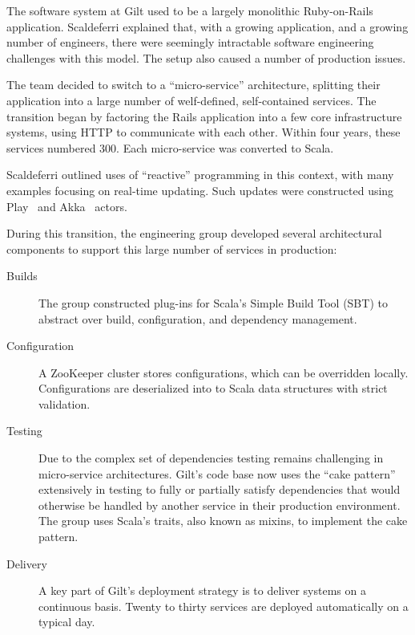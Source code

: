 \documentclass{jfp1}
\begin{document}
The software system at Gilt used to be a largely monolithic Ruby-on-Rails
application.  Scaldeferri explained that, with a growing application, and
a growing number of engineers, there were seemingly intractable software
engineering challenges with this model. The setup also caused a number of
production issues.

The team decided to switch to a ``micro-service'' architecture, splitting
their application into a large number of welf-defined, self-contained
services. The transition began by factoring the Rails application into a
few core infrastructure systems, using HTTP to communicate with each
other. Within four years, these services numbered 300. Each micro-service
was converted to Scala. 

Scaldeferri outlined uses of ``reactive'' programming in this context,
with many examples focusing on real-time updating.  Such updates were
constructed using Play~\cite{Typesafe:2014:Play} and
Akka~\cite{Typesafe:2014:Akka} actors.

During this transition, the engineering group developed several
architectural components to support this large number of services in
production:
\begin{description}
\item[Builds] The group constructed plug-ins for Scala's Simple Build
Tool (SBT) to abstract over build, configuration, and dependency
management.

\item[Configuration] A ZooKeeper cluster stores configurations, which can
be overridden locally. Configurations are deserialized into to Scala data
structures with strict validation.

\item[Testing] Due to the complex set of dependencies testing remains
challenging in micro-service architectures.  Gilt's code base now uses the
``cake pattern'' extensively in testing to fully or partially satisfy
dependencies that would otherwise be handled by another service in their
production environment. The group uses Scala's traits, also known as
mixins, to implement the cake pattern.
 
\item[Delivery] A key part of Gilt's deployment strategy is to deliver
systems on a continuous basis. Twenty to thirty services are deployed
automatically on a typical day.
\end{description}

\end{document}
